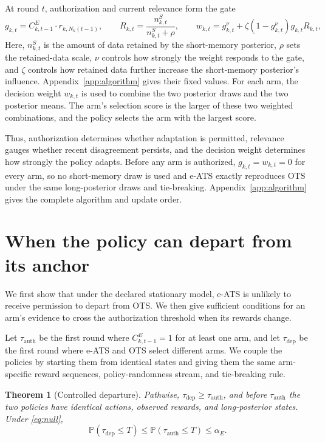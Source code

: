 \documentclass{article}
\newcommand{\method}{e-ATS}
\newcommand{\anchor}{OTS}
\newcommand{\Pp}{\mathbb P}
\newcommand{\1}{\mathbf 1}
\newcommand{\tauth}{\tau_{\mathrm{auth}}}
\newcommand{\tdep}{\tau_{\mathrm{dep}}}
\newcommand{\alphaE}{\alpha_E}
\newtheorem{theorem}{Theorem}
\begin{document}
At round $t$, authorization and current relevance form the gate
\begin{equation}
g_{k,t}=C^E_{k,t-1} \cdot r_{k,N_k(t-1)},\qquad
R_{k,t}=\frac{n^S_{k,t}}{n^S_{k,t}+\rho},\qquad
w_{k,t}=g_{k,t}^{\nu}
+\zeta(1-g_{k,t}^{\nu})g_{k,t}R_{k,t},
\label{eq:weight}
\end{equation}
Here, $n^S_{k,t}$ is the amount of data retained by the short-memory
posterior, $\rho$ sets the retained-data scale, $\nu$ controls how strongly
the weight responds to the gate, and $\zeta$ controls how retained data further
increase the short-memory posterior's influence. Appendix~\ref{app:algorithm} gives their
fixed values.
For each arm, the decision weight $w_{k,t}$ is used to combine the two posterior draws and the two posterior means.
The arm's selection score is the larger of these two weighted combinations, and the policy selects the arm with the largest score.

Thus, authorization determines whether adaptation is permitted, relevance
gauges whether recent disagreement persists, and the decision weight
determines how strongly the policy adapts. Before any arm is authorized,
$g_{k,t}=w_{k,t}=0$ for every arm, so no short-memory draw is used and
\method{} exactly reproduces \anchor{} under the same long-posterior draws and
tie-breaking. Appendix~\ref{app:algorithm} gives the complete algorithm and
update order.


\section{When the policy can depart from its anchor}

We first show that under the declared stationary model, \method{} is unlikely
to receive permission to depart from \anchor{}.
We then give sufficient conditions for an arm's evidence to cross the
authorization threshold when its rewards change.

Let $\tauth$ be the first round where
$C^E_{k,t-1}=1$ for at least one arm, and let $\tdep$ be the first round where \method{} and \anchor{} select different arms.
We couple the policies by starting them from identical states and giving
them the same arm-specific reward sequences, policy-randomness stream,
and tie-breaking rule.

\begin{theorem}[Controlled departure]
\label{thm:main}
Pathwise, $\tdep\ge\tauth$, and before $\tauth$ the two policies have identical
actions, observed rewards, and long-posterior states. Under \eqref{eq:null},
\begin{equation}
 \Pp(\tdep\le T)\le\Pp(\tauth\le T)\le\alphaE.
 \label{eq:departure}
\end{equation}
\end{theorem}
\end{document}
